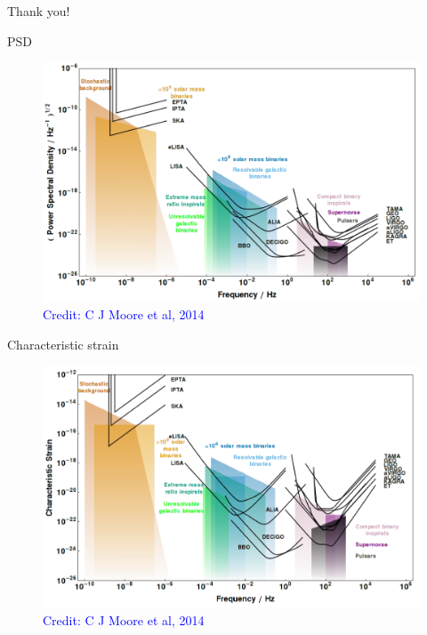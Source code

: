 \documentclass[pdf]{beamer}
\newcommand{\credit}[1]{\tiny{\textcolor{blue}{Credit: #1}}}
\begin{document}
\begin{frame}
\begin{center}
\Huge Thank you!
\end{center}
\end{frame}

\begin{frame}{PSD}
\begin{figure}
\includegraphics[scale=.2]{fig/PSD-TOT.png}
\caption*{\credit{C J Moore et al, 2014}}
\end{figure}
\end{frame}

\begin{frame}{Characteristic strain}
\begin{figure}
\includegraphics[scale=.2]{fig/Char-TOT.png}
\caption*{\credit{C J Moore et al, 2014}}
\end{figure}
\end{frame}
\end{document}
